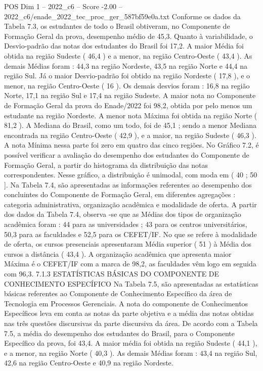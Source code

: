 \begin{textsample}{POS Dim 1 – 2022\_c6 – Score -2.00 – 2022\_c6/enade\_2022\_tec\_proc\_ger\_587bf59e0a.txt}
Conforme os dados da Tabela 7.3, os estudantes de todo o Brasil obtiveram, no Componente de Formação Geral da prova, desempenho médio de 45,3.
Quanto à variabilidade, o Desvio-padrão das notas dos estudantes do Brasil foi 17,2.
A maior Média foi obtida na região Sudeste ( 46,4 ) e a menor, na região Centro-Oeste ( 43,4 ).
As demais Médias foram : 44,3 na região Nordeste, 43,5 na região Norte e 44,4 na região Sul.
Já o maior Desvio-padrão foi obtido na região Nordeste ( 17,8 ), e o menor, na região Centro-Oeste ( 16 ).
Os demais desvios foram : 16,8 na região Norte, 17,1 na região Sul e 17,4 na região Sudeste.
A maior nota no Componente de Formação Geral da prova do Enade/2022 foi 98,2, obtida por pelo menos um estudante na região Nordeste.
A menor nota Máxima foi obtida na região Norte ( 81,2 ).
A Mediana do Brasil, como um todo, foi de 45,1 ; sendo a menor Mediana encontrada na região Centro-Oeste ( 42,9 ), e a maior, na região Sudeste ( 46,3 ).
A nota Mínima nessa parte foi zero em quatro das cinco regiões.
No Gráfico 7.2, é possível verificar a avaliação do desempenho dos estudantes do Componente de Formação Geral, a partir do histograma da distribuição das notas correspondentes.
Nesse gráfico, a distribuição é unimodal, com moda em ( 40 ; 50 ].
Na Tabela 7.4, são apresentadas as informações referentes ao desempenho dos concluintes do Componente de Formação Geral, em diferentes agregações : categoria administrativa, organização acadêmica e modalidade de oferta.
A partir dos dados da Tabela 7.4, observa -se que as Médias dos tipos de organização acadêmica foram : 44 para as universidades ; 43 para os centros universitários, 50,3 para as faculdades e 52,5 para os CEFET/IF.
No que se refere à modalidade de oferta, os cursos presenciais apresentaram Média superior ( 51 ) à Média dos cursos a distância ( 43,4 ).
A organização acadêmica que apresenta maior Máxima é o CEFET/IF com a marca de 98,2, as faculdades vêm logo em seguida com 96,3. 7.1.3 ESTATÍSTICAS BÁSICAS DO COMPONENTE DE CONHECIMENTO ESPECÍFICO Na Tabela 7.5, são apresentadas as estatísticas básicas referentes ao Componente de Conhecimento Específico da área de Tecnologia em Processos Gerenciais.
A nota do componente de Conhecimentos Específicos leva em conta as notas da parte objetiva e a média das notas obtidas nas três questões discursivas da parte discursiva da área.
De acordo com a Tabela 7.5, a média do desempenho dos estudantes do Brasil, para o Componente Específico da prova, foi 43,4.
A maior média foi obtida na região Sudeste ( 44,1 ), e a menor, na região Norte ( 40,3 ).
As demais Médias foram : 43,4 na região Sul, 42,6 na região Centro-Oeste e 40,9 na região Nordeste.

\end{textsample}
